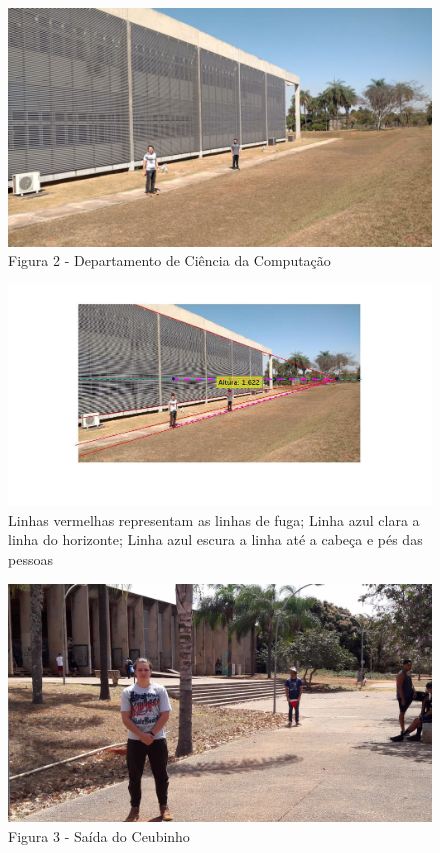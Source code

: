 \documentclass[a4paper, 12pt]{article}
\begin{document}
    \begin{figure}[H]
		\centering
		\includegraphics[width=0.68\linewidth]{nolines2.jpeg}
		\caption{Figura 2 - Departamento de Ciência da Computação}
	\end{figure}

    \begin{figure}[H]
		\centering
		\includegraphics[width=0.95\linewidth]{lines2.jpg}
		\caption{Linhas vermelhas representam as linhas de fuga; Linha azul clara a linha do horizonte; Linha azul escura a linha até a cabeça e pés das pessoas}
	\end{figure}

    \begin{figure}[H]
		\centering
		\includegraphics[width=0.68\linewidth]{nolines3.jpg}
		\caption{Figura 3 - Saída do Ceubinho}
	\end{figure}
\end{document}
